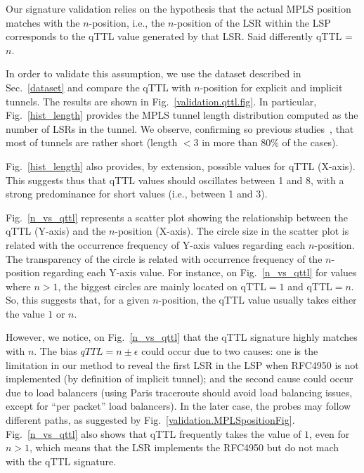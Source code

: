 Our signature validation relies on the hypothesis that the actual MPLS position
matches with the $n$-position, i.e., the $n$-position of the LSR within the LSP
corresponds to the qTTL value generated by that LSR. Said differently qTTL =
$n$.

In order to validate this assumption, we use the dataset described in
Sec.~\ref{dataset} and compare the qTTL with $n$-position for explicit and
implicit tunnels.
The results are shown in Fig.~\ref{validation.qttl.fig}.  In particular,
Fig.~\ref{hist_length} provides the MPLS tunnel length distribution computed as
the number of LSRs in the tunnel.  We observe, confirming so previous
studies~\cite{SOM11,Vanaubel15,Donnet12}, that most of tunnels are rather short
(length $< 3$ in more than 80\% of the cases).

Fig.~\ref{hist_length} also provides, by extension, possible values for qTTL
(X-axis).  This suggests thus that qTTL values should oscillates between 1 and
8, with a strong predominance for short values (i.e., between 1 and 3). 

Fig.~\ref{n_vs_qttl} represents a scatter plot showing the relationship between
the qTTL (Y-axis) and the $n$-position (X-axis).  The circle size in the scatter
plot is related with the occurrence frequency of Y-axis values regarding each
$n$-position.  The transparency of the circle is related with occurrence
frequency of the $n$-position regarding each Y-axis value.  For instance, on
Fig.~\ref{n_vs_qttl} for values where $n>1$, the biggest circles are mainly
located on qTTL$=1$ and qTTL$=n$.  So, this suggests that, for a given
$n$-position, the qTTL value usually takes either the value $1$ or $n$.

However, we notice, on Fig.~\ref{n_vs_qttl} that the qTTL signature highly
matches with $n$.   The bias $\textit{qTTL}=n \pm \epsilon$ could occur due to
two causes: one is the limitation in our method to reveal the first LSR in the
LSP when RFC4950 is not implemented (by definition of implicit tunnel); and the
second cause could occur due to load balancers (using Paris traceroute should
avoid load balancing issues, except for ``per packet'' load balancers).
In the later case, the \traceroute probes may follow different paths, as
suggested by Fig.~\ref{validation.MPLSpositionFig}. Fig.~\ref{n_vs_qttl} also
shows that qTTL frequently takes the value of $1$, even for $n>1$, which means
that the LSR implements the RFC4950 but do not mach with the qTTL signature.

